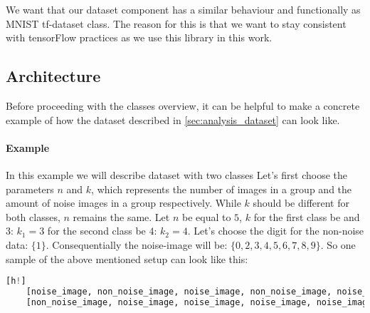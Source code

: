 We want that our dataset component has a similar behaviour and functionally
as MNIST tf-dataset class. The reason for this is that we want to stay
consistent with tensorFlow practices as we use this library in this work.





\subsection{Architecture}

Before proceeding with the classes overview, it can be helpful
to make a concrete example of how the dataset described in
\autoref{sec:analysis_dataset} can look like.

\paragraph{Example} In this example we will describe dataset with two classes
Let's first choose the parameters $n$ and $k$,
which represents the number of images in a group and the amount of noise images
in a group respectively. While $k$
should be different for both classes, $n$ remains the same.
Let $n$ be equal to $5$, $k$ for the first class be and $3$: $k_1 = 3$
for the second class be $4$: $k_2 = 4$. Let's choose the digit for the non-noise
data: $\{1\}$. Consequentially the noise-image will
be: $\{0, 2, 3, 4, 5, 6, 7, 8, 9\}$.
So one sample of the above mentioned setup can look like this:

\begin{lstlisting}[language=Python][h!]
	[noise_image, non_noise_image, noise_image, non_noise_image, noise_image ] # class 1
	[non_noise_image, noise_image, noise_image, noise_image, noise_image ] # class 2
\end{lstlisting}

